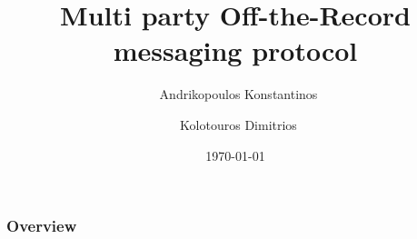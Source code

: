 \documentclass{beamer}
\title[mpOTR]{Multi party Off-the-Record messaging protocol} %
\author[Andrikopoulos, Kolotouros]{~Andrikopoulos Konstantinos\inst{1} \and ~Kolotouros Dimitrios\inst{2}} %
\institute[NTUA] %
{
  \inst{1}%
  National Technical University of Athens \texttt{[image: Figures/Pyrforos.png]} \\ %
  \textit{gkonstandinos@gmail.com} %
  \and
  \inst{2}%
  National Technical University of Athens \texttt{[image: Figures/Pyrforos.png]} \\ %
  \textit{dim.kolotouros@gmail.com} %
\medskip
}
\date{{\ddmmyyyydate\today}} %
\begin{document}
\begin{frame}
\titlepage %
\end{frame}

\begin{frame}
\frametitle{Overview} %
\tableofcontents %
\end{frame}













\end{document}
